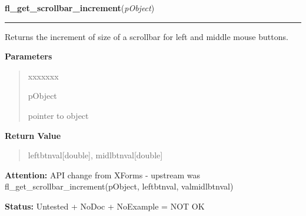 \hspace{.8\funcindent}\begin{boxedminipage}{\funcwidth}

    \raggedright \textbf{fl\_get\_scrollbar\_increment}(\textit{pObject})

    \vspace{-1.5ex}

    \rule{\textwidth}{0.5\fboxrule}
\setlength{\parskip}{2ex}
    Returns the increment of size of a scrollbar for left and middle mouse 
    buttons.

\setlength{\parskip}{1ex}
      \textbf{Parameters}
      \vspace{-1ex}

      \begin{quote}
        \begin{Ventry}{xxxxxxx}

          \item[pObject]

          pointer to object

        \end{Ventry}

      \end{quote}

      \textbf{Return Value}
    \vspace{-1ex}

      \begin{quote}
      leftbtnval[double], midlbtnval[double]

      \end{quote}

\textbf{Attention:} API change from XForms - upstream was 
fl\_get\_scrollbar\_increment(pObject, leftbtnval, valmidlbtnval)



\textbf{Status:} Untested + NoDoc + NoExample = NOT OK



    \end{boxedminipage}

    \label{xformslib:library:fl_set_scrollbar_bounds}

    \vspace{0.5ex}

